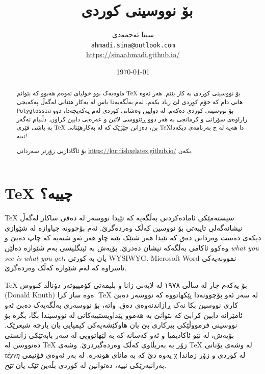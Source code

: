 \documentclass[14pt]{article}
\title{ \XeLaTeX~بۆ نووسینی کوردی}
\author{سینا ئەحمەدی \\ {\small \texttt{ahmadi.sina@outlook.com} } \\ {\small \url{https://sinaahmadi.github.io/}}}
\date{\today}
\begin{document}
\maketitle
\tableofcontents

\begin{abstract}

ماوەیەک بوو خولیای ئەوەم هەبوو کە بتوانم 
\textenglish{\TeX} بۆ نووسینی کوردی بە کار بێنم. هەر ئەوە هانی دام کە خۆم کوردی لێ زیاد بکەم.
لەم بەڵگەیەدا باس لە بەکار هێنانی \textenglish{\XeLaTeX} لەگەڵ پەکەیجی 
\texttt{\textenglish{Polyglossia}}
 بۆ نووسینی کوردی دەکەم.
 لە دوایین وەشانی کوردی لەم پەکەیجەدا، دوو زاراوەی سۆرانی و کرمانجی بە هەر دوو ڕێنووسی لاتین و عەرەبی دابین کراون.
دڵنیام ئەگەر بە باشی فێری \textenglish{\TeX} بن، دەزانن چێژێک کە لە بەکارهێنانی \textenglish{\TeX}دا هەیە لە چ بەرنامەی دیکەدا نییە!

بۆ ئاگاداریی زۆرتر سەردانی 
\url{https://kurdishxelatex.github.io/}
بکەن.

\end{abstract}

\section{\textenglish{\TeX} چییە؟}

\textenglish{\TeX} سیستەمێکی ئامادەکردنی بەڵگەیە کە تێیدا نووسەر لە دەقی ساکار لەگەڵ نیشانەگەلی تایبەتی بۆ نووسین کەڵک وەردەگرێ. ئەم بۆچوونە جیاوازە لە شێوازی دیکەی دەست وەردانی دەق کە تێیدا هەر شتێک بێتە چاو هەر ئەو شتەیە کە چاپ دەبێ و وەکوو ئاکامی بەڵگەکە نیشان دەدرێ. بۆیەش بە ئینگلیسی بەم شێوازە دەڵێن \textenglish{\textit{what you see is what you get}}، یان بە کورتی \textenglish{WYSIWYG}. \textenglish{Microsoft Word} نموونەیەکی ناسراوە کە لەم شێوازە کەڵک وەردەگرێ.

\textenglish{\TeX}
بۆ یەکەم جار لە ساڵی ١٩٧٨ لە لایەنی زانا و بلیمەتی کۆمپیوتەر دۆناڵد کنووس
(\textenglish{Donald Knuth})
ەوە ساز کرا.
\textenglish{\TeX} لە سەر ئەو بۆچوونەدا پێکهاتووە کە نووسەر دەبێ کاری نووسین بکا نەک ڕازاندنەوەی دەق. واتە، بۆ نووسەری بەڵگەیەک دەبێ ئەو ئامێرانە دابین کرابێ کە بتوانێ بە هەموو پێداویستییەکانی لە نووسیندا بگا، بگرە بۆ نووسینی فرمووڵێکی بیرکاری بێ یان هاوکێشەیەکی کیمیایی یان پارچە شیعرێک. بۆیەش، لە نێو ئاکادیمیا و ئەو کەسانه کە بە لێهاتوویی لە سەر بابەتێکی زانستی دەنووسن لە \textenglish{\TeX} زۆر بە بەربڵاوی کەڵک وەردەگیردرێ. 
وشەی 
\textenglish{\TeX}
 لە وشەی یۆنانی
\textgreek{\textit{τέχνη}}
یەوە
 دێ کە بە مانای هونەرە. لە بەر ئەوەی فۆنیمی 
\textgreek{χ} 
 لە کوردی و زۆر زماندا بەرانبەرێکی نییە، دەتوانین لە کوردی بڵەین
\textit{تێک} یان \textit{تێخ}.
\end{document}
